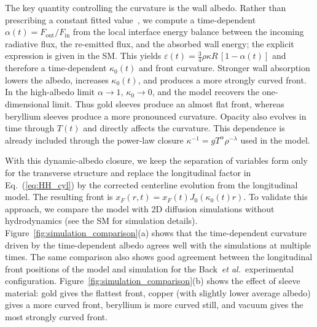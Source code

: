\documentclass[prl, twocolumn, superscriptaddress, amsmath, amssymb, reprint]{revtex4-2}
\begin{document}
The key quantity controlling the curvature is the wall albedo. Rather than prescribing a constant fitted value~\cite{Hurricane2006,Courtois2022}, we compute a time-dependent $\alpha(t)=F_{\mathrm{out}}/F_{\mathrm{in}}$ from the local interface energy balance between the incoming radiative flux, the re-emitted flux, and the absorbed wall energy; the explicit expression is given in the SM.
This yields $\varepsilon(t)=\tfrac{3}{4}\rho\kappa R\,[1-\alpha(t)]$ and therefore a time-dependent $\kappa_0(t)$ and front curvature. Stronger wall absorption lowers the albedo, increases $\kappa_0(t)$, and produces a more strongly curved front. In the high-albedo limit $\alpha\to1$, $\kappa_0\to0$, and the model recovers the one-dimensional limit. Thus gold sleeves produce an almost flat front, whereas beryllium sleeves produce a more pronounced curvature.
Opacity also evolves in time through $T(t)$ and directly affects the curvature. This dependence is already included through the power-law closure $\kappa^{-1}=gT^{\alpha}\rho^{-\lambda}$ used in the model.

With this dynamic-albedo closure, we keep the separation of variables form only for the transverse structure and replace the longitudinal factor in Eq.~(\ref{eq:HH_cyl}) by the corrected centerline evolution from the longitudinal model. The resulting front is $x_F(r,t)=x_F(t)J_0\!\left(\kappa_0(t) r\right)$. To validate this approach, we compare the model with 2D diffusion simulations without hydrodynamics (see the SM for simulation details). Figure~\ref{fig:simulation_comparison}(a) shows that the time-dependent curvature driven by the time-dependent albedo agrees well with the simulations at multiple times. The same comparison also shows good agreement between the longitudinal front positions of the model and simulation for the Back \,\textit{et al.}\, experimental configuration. Figure~\ref{fig:simulation_comparison}(b) shows the effect of sleeve material: gold gives the flattest front, copper (with slightly lower average albedo) gives a more curved front, beryllium is more curved still, and vacuum gives the most strongly curved front.
\end{document}

